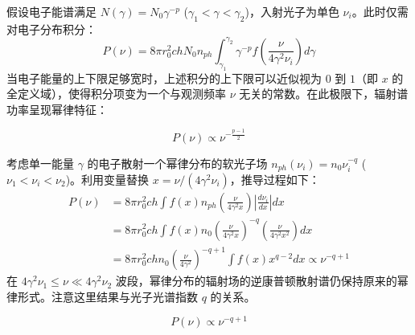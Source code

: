 \begin{example}[幂律分布电子系对单色场的散射]
假设电子能谱满足 $N(\gamma) = N_0 \gamma^{-p}$ ($\gamma_1 < \gamma < \gamma_2$)，入射光子为单色 $\nu_i$。此时仅需对电子分布积分：
\begin{equation}
    P(\nu) = 8\pi r_0^2 ch N_0 n_{ph} \int_{\gamma_1}^{\gamma_2} \gamma^{-p} f\left(\frac{\nu}{4\gamma^2 \nu_i}\right) d\gamma
\end{equation}
当电子能量的上下限足够宽时，上述积分的上下限可以近似视为 $0$ 到 $1$（即 $x$ 的全定义域），使得积分项变为一个与观测频率 $\nu$ 无关的常数。在此极限下，辐射谱功率呈现幂律特征：
\begin{tcolorbox}[colframe=black, colback=white, boxrule=0.5pt, arc=0pt]
\begin{equation}
    P(\nu) \propto \nu^{-\frac{p-1}{2}}
\end{equation}
\end{tcolorbox}
\end{example}

\begin{example}[单电子对多色幂律光子场的散射]
考虑单一能量 $\gamma$ 的电子散射一个幂律分布的软光子场 $n_{ph}(\nu_i) = n_0 \nu_i^{-q}$ ($\nu_1 < \nu_i < \nu_2$)。利用变量替换 $x = \nu / (4\gamma^2 \nu_i)$，推导过程如下：
\begin{equation}
    \begin{aligned}
        P(\nu) &= 8\pi r_0^2 ch \int f(x) n_{ph}\left(\frac{\nu}{4\gamma^2 x}\right) \left| \frac{d\nu_i}{dx} \right| dx \\
        &= 8\pi r_0^2 ch \int f(x) n_0 \left( \frac{\nu}{4\gamma^2 x} \right)^{-q} \left( \frac{\nu}{4\gamma^2 x^2} \right) dx \\
        &= 8\pi r_0^2 ch n_0 \left( \frac{\nu}{4\gamma^2} \right)^{-q+1} \int f(x) x^{q-2} dx \propto \nu^{-q+1}
    \end{aligned}
\end{equation}
在 $4\gamma^2 \nu_1 \le \nu \ll 4\gamma^2 \nu_2$ 波段，幂律分布的辐射场的逆康普顿散射谱仍保持原来的幂律形式。注意这里结果与光子光谱指数 $q$ 的关系。
\begin{tcolorbox}[colframe=black, colback=white, boxrule=0.5pt, arc=0pt]
\begin{equation}
    P(\nu) \propto \nu^{-q+1}
\end{equation}
\end{tcolorbox}
\end{example}

